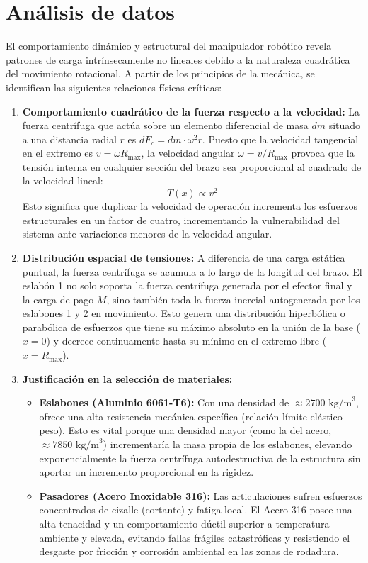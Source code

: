 \documentclass[11pt,a4paper]{article}
\begin{document}
\section{Análisis de datos}
El comportamiento dinámico y estructural del manipulador robótico revela patrones de carga intrínsecamente no lineales debido a la naturaleza cuadrática del movimiento rotacional. A partir de los principios de la mecánica, se identifican las siguientes relaciones físicas críticas:
\begin{enumerate}
    \item \textbf{Comportamiento cuadrático de la fuerza respecto a la velocidad:}
    La fuerza centrífuga que actúa sobre un elemento diferencial de masa $dm$ situado a una distancia radial $r$ es $dF_c = dm \cdot \omega^2 r$. Puesto que la velocidad tangencial en el extremo es $v = \omega R_{\text{max}}$, la velocidad angular $\omega = v / R_{\text{max}}$ provoca que la tensión interna en cualquier sección del brazo sea proporcional al cuadrado de la velocidad lineal:
    $$T(x) \propto v^2$$
    Esto significa que duplicar la velocidad de operación incrementa los esfuerzos estructurales en un factor de cuatro, incrementando la vulnerabilidad del sistema ante variaciones menores de la velocidad angular.
    \item \textbf{Distribución espacial de tensiones:}
    A diferencia de una carga estática puntual, la fuerza centrífuga se acumula a lo largo de la longitud del brazo. El eslabón 1 no solo soporta la fuerza centrífuga generada por el efector final y la carga de pago $M$, sino también toda la fuerza inercial autogenerada por los eslabones 1 y 2 en movimiento. Esto genera una distribución hiperbólica o parabólica de esfuerzos que tiene su máximo absoluto en la unión de la base ($x = 0$) y decrece continuamente hasta su mínimo en el extremo libre ($x = R_{\text{max}}$).
    \item \textbf{Justificación en la selección de materiales:}
    \begin{itemize}
        \item \textbf{Eslabones (Aluminio 6061-T6):} Con una densidad de $\approx 2700\text{ kg/m}^3$, ofrece una alta resistencia mecánica específica (relación límite elástico-peso). Esto es vital porque una densidad mayor (como la del acero, $\approx 7850\text{ kg/m}^3$) incrementaría la masa propia de los eslabones, elevando exponencialmente la fuerza centrífuga autodestructiva de la estructura sin aportar un incremento proporcional en la rigidez.
        \item \textbf{Pasadores (Acero Inoxidable 316):} Las articulaciones sufren esfuerzos concentrados de cizalle (cortante) y fatiga local. El Acero 316 posee una alta tenacidad y un comportamiento dúctil superior a temperatura ambiente y elevada, evitando fallas frágiles catastróficas y resistiendo el desgaste por fricción y corrosión ambiental en las zonas de rodadura.
    \end{itemize}
\end{enumerate}
\end{document}
